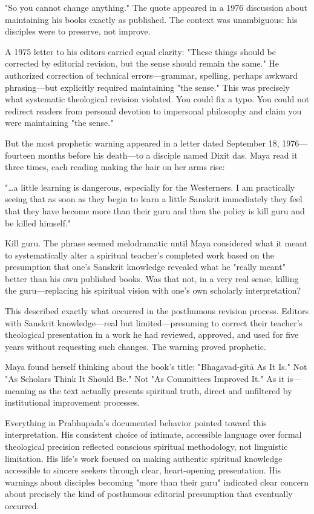 \documentclass[12pt,twoside]{book}
\begin{document}
"So you cannot change anything." The quote appeared in a 1976 discussion about maintaining his books exactly as published. The context was unambiguous: his disciples were to preserve, not improve.

A 1975 letter to his editors carried equal clarity: "These things should be corrected by editorial revision, but the sense should remain the same." He authorized correction of technical errors—grammar, spelling, perhaps awkward phrasing—but explicitly required maintaining "the sense." This was precisely what systematic theological revision violated. You could fix a typo. You could not redirect readers from personal devotion to impersonal philosophy and claim you were maintaining "the sense."

But the most prophetic warning appeared in a letter dated September 18, 1976—fourteen months before his death—to a disciple named Dixit das. Maya read it three times, each reading making the hair on her arms rise:

"\ldots{}a little learning is dangerous, especially for the Westerners. I am practically seeing that as soon as they begin to learn a little Sanskrit immediately they feel that they have become more than their guru and then the policy is kill guru and be killed himself."

Kill guru. The phrase seemed melodramatic until Maya considered what it meant to systematically alter a spiritual teacher's completed work based on the presumption that one's Sanskrit knowledge revealed what he "really meant" better than his own published books. Was that not, in a very real sense, killing the guru—replacing his spiritual vision with one's own scholarly interpretation?

This described exactly what occurred in the posthumous revision process. Editors with Sanskrit knowledge—real but limited—presuming to correct their teacher's theological presentation in a work he had reviewed, approved, and used for five years without requesting such changes. The warning proved prophetic.

Maya found herself thinking about the book's title: "Bhagavad-gītā As It Is." Not "As Scholars Think It Should Be." Not "As Committees Improved It." As it is—meaning as the text actually presents spiritual truth, direct and unfiltered by institutional improvement processes.

Everything in Prabhupāda's documented behavior pointed toward this interpretation. His consistent choice of intimate, accessible language over formal theological precision reflected conscious spiritual methodology, not linguistic limitation. His life's work focused on making authentic spiritual knowledge accessible to sincere seekers through clear, heart-opening presentation. His warnings about disciples becoming "more than their guru" indicated clear concern about precisely the kind of posthumous editorial presumption that eventually occurred.
\end{document}

